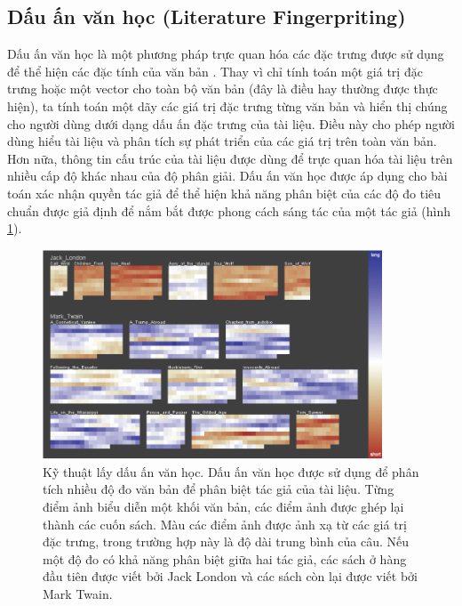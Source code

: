 \documentclass[14pt, a4paper]{article}
\numberwithin{equation}{section}
\numberwithin{figure}{section}
\numberwithin{dl}{section}
\numberwithin{md}{section}
\numberwithin{bd}{section}
\numberwithin{dn}{section}
\numberwithin{hq}{section}
\begin{document}
    \subsection{Dấu ấn văn học (Literature Fingerpriting)}


    Dấu ấn văn học là một phương pháp trực quan hóa các đặc trưng được sử dụng để thể hiện các đặc tính của văn bản \cite{222}.
    Thay vì chỉ tính toán một giá trị đặc trưng hoặc một vector cho toàn bộ văn bản (đây là điều hay thường được thực hiện), ta tính toán một dãy các giá trị đặc trưng từng văn bản và hiển thị chúng cho người dùng dưới dạng dấu ấn đặc trưng của tài liệu.
    Điều này cho phép người dùng hiểu tài liệu và phân tích sự phát triển của các giá trị trên toàn văn bản.
    Hơn nữa, thông tin cấu trúc của tài liệu được dùng để trực quan hóa tài liệu trên nhiều cấp độ khác nhau của độ phân giải.
    Dấu ấn văn học được áp dụng cho bài toán xác nhận quyền tác giả để thể hiện khả năng phân biệt của các độ đo tiêu chuẩn được giả định để nắm bắt được phong cách sáng tác của một tác giả (hình \ref{fig:9}).

    \begin{figure}[h!]
        \centering
        \includegraphics[width=0.9\textwidth]{9.png}
        \caption{Kỹ thuật lấy dấu ấn văn học. Dấu ấn văn học được sử dụng để phân tích nhiều độ đo văn bản để phân biệt tác giả của tài liệu.
        Từng điểm ảnh biểu diễn một khối văn bản, các điểm ảnh được ghép lại thành các cuốn sách.
        Màu các điểm ảnh được ảnh xạ từ các giá trị đặc trưng, trong trường hợp này là độ dài trung bình của câu.
        Nếu một độ đo có khả năng phân biệt giữa hai tác giả, các sách ở hàng đầu tiên được viết bởi Jack London và các sách còn lại được viết bởi Mark Twain. \cite{222}}
        \label{fig:9}
    \end{figure}
\end{document}
